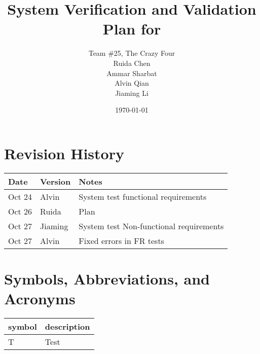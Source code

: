 \documentclass[12pt, titlepage]{article}
\begin{document}
\title{System Verification and Validation Plan for \progname{}} 
\author{
    Team \#25, The Crazy Four \\[1ex]
    Ruida Chen \\
    Ammar Sharbat \\
    Alvin Qian \\
    Jiaming Li
}
\date{\today}
	
\maketitle


\section*{Revision History}

\begin{tabularx}{\textwidth}{p{3cm}p{2cm}X}
\toprule {\bf Date} & {\bf Version} & {\bf Notes}\\
\midrule
Oct 24 & Alvin & System test functional requirements\\
Oct 26 & Ruida & Plan\\
Oct 27 & Jiaming & System test Non-functional requirements\\
Oct 27 & Alvin & Fixed errors in FR tests\\
\bottomrule
\end{tabularx}


\newpage

\tableofcontents

\listoftables
{}

\listoffigures
{}

\newpage

\section{Symbols, Abbreviations, and Acronyms}

\renewcommand{\arraystretch}{1.2}
\begin{tabular}{l l} 
  \toprule		
  \textbf{symbol} & \textbf{description}\\
  \midrule 
  T & Test\\
  \bottomrule
\end{tabular}\\

\end{document}
